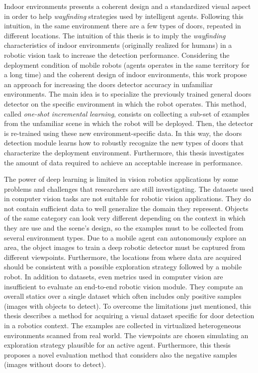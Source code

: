 Indoor environments presents a coherent design and a standardized visual aspect in order to help \textit{wayfinding} strategies used by intelligent agents. Following this intuition, in the same environment there are a few types of doors, repeated in different locations. The intuition of this thesis is to imply the \textit{wayfinding} characteristics of indoor environments (originally realized for humans) in a robotic vision task to increase the detection performance. Considering the deployment condition of mobile robots (agents operates in the same territory for a long time) and the coherent design of indoor environments, this work propose an approach for increasing the doors detector accuracy in unfamiliar environments. The main idea is to specialize the previously trained general doors detector on the specific environment in which the robot operates. This method, called \textit{one-shot incremental learning}, consists on collecting a sub-set of examples from the unfamiliar scene in which the robot will be deployed. Then, the detector is re-trained using these new environment-specific data. In this way, the doors detection module learns how to robustly recognize the new types of doors that characterize the deployment environment. Furthermore, this thesis investigates the amount of data required to achieve an acceptable increase in performance.

The power of deep learning is limited in vision robotics applications by some problems and challenges that researchers are still investigating. The datasets used in computer vision tasks are not suitable for robotic vision applications. They do not contain sufficient data to well generalize the domain they represent. Objects of the same category can look very different depending on the context in which they are use and the scene's design, so the examples must to be collected from several environment types. Due to a mobile agent can autonomously explore an area, the object images to train a deep robotic detector must be captured from different viewpoints. Furthermore, the locations from where data are acquired should be consistent with a possible exploration strategy followed by a mobile robot. In addition to datasets, even metrics used in computer vision are insufficient to evaluate an end-to-end robotic vision module. They compute an overall statics over a single dataset which often includes only positive samples (images with objects to detect). To overcome the limitations just mentioned, this thesis describes a method for acquiring a visual dataset specific for door detection in a robotics context. The examples are collected in virtualized heterogeneous environments scanned from real world. The viewpoints are chosen simulating an exploration strategy plausible for an active agent. Furthermore, this thesis proposes a novel evaluation method that considers also the negative samples (images without doors to detect).

